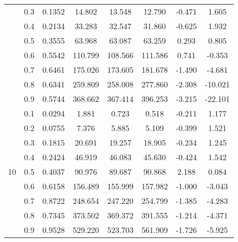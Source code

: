 \documentclass[11pt,a4paper]{report}
\begin{document}
\begin{longtable}{ | c | c || c | c | c | c | c | c | }
 & 0.3 & 0.1352 & 14.802 & 13.548 & 12.790 & -0.471 & 1.605 \\
 & 0.4 & 0.2134 & 33.283 & 32.547 & 31.860 & -0.625 & 1.932 \\
 & 0.5 & 0.3555 & 63.968 & 63.087 & 63.259 & 0.293 & 0.805 \\
 & 0.6 & 0.5542 & 110.799 & 108.566 & 111.586 & 0.741 & -0.353 \\
 & 0.7 & 0.6461 & 175.026 & 173.605 & 181.678 & -1.490 & -4.681 \\
 & 0.8 & 0.6341 & 259.809 & 258.008 & 277.860 & -2.308 & -10.021 \\
 & 0.9 & 0.5744 & 368.662 & 367.414 & 396.253 & -3.215 & -22.101 \\
 \hline
\multirow{9}{*}{10} & 0.1 & 0.0294 & 1.881 & 0.723 & 0.518 & -0.211 & 1.177 \\
 & 0.2 & 0.0755 & 7.376 & 5.885 & 5.109 & -0.399 & 1.521 \\
 & 0.3 & 0.1815 & 20.691 & 19.257 & 18.905 & -0.234 & 1.245 \\
 & 0.4 & 0.2424 & 46.919 & 46.083 & 45.630 & -0.424 & 1.542 \\
 & 0.5 & 0.4037 & 90.976 & 89.687 & 90.868 & 2.188 & 0.084 \\
 & 0.6 & 0.6158 & 156.489 & 155.999 & 157.982 & -1.000 & -3.043 \\
 & 0.7 & 0.8722 & 248.654 & 247.220 & 254.799 & -1.385 & -4.283 \\
 & 0.8 & 0.7345 & 373.502 & 369.372 & 391.555 & -1.214 & -4.371 \\
 & 0.9 & 0.9528 & 529.220 & 523.703 & 561.909 & -1.726 & -5.925 \\
 \hline
\hline
\end{longtable}
\end{document}
